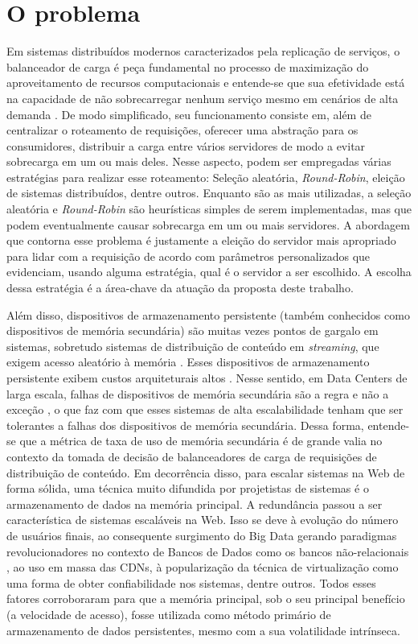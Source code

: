 \section{O problema} \label{sec:problema}

Em sistemas distribuídos modernos caracterizados pela replicação de serviços, o balanceador de carga é peça fundamental no processo de maximização do aproveitamento de recursos computacionais e entende-se que sua efetividade está na capacidade de não sobrecarregar nenhum serviço mesmo em cenários de alta demanda \cite{dos2019balanceamento}. De modo simplificado, seu funcionamento consiste em, além de centralizar o roteamento de requisições, oferecer uma abstração para os consumidores, distribuir a carga entre vários servidores de modo a evitar sobrecarga em um ou mais deles. Nesse aspecto, podem ser empregadas várias estratégias para realizar esse roteamento: Seleção aleatória, \textit{Round-Robin}, eleição de sistemas distribuídos, dentre outros. Enquanto são as mais utilizadas, a seleção aleatória e \textit{Round-Robin} são heurísticas simples de serem implementadas, mas que podem eventualmente causar sobrecarga em um ou mais servidores. A abordagem que contorna esse problema é justamente a eleição do servidor mais apropriado para lidar com a requisição de acordo com parâmetros personalizados que evidenciam, usando alguma estratégia, qual é o servidor a ser escolhido. A escolha dessa estratégia é a área-chave da atuação da proposta deste trabalho.

Além disso, dispositivos de armazenamento persistente (também conhecidos como dispositivos de memória secundária) são muitas vezes pontos de gargalo em sistemas, sobretudo sistemas de distribuição de conteúdo em \textit{streaming}, que exigem acesso aleatório à memória \cite{sivathanu2013IOWorkloads}. Esses dispositivos de armazenamento persistente exibem custos arquiteturais altos \cite{arpaciDusseau98}. Nesse sentido, em Data Centers de larga escala, falhas de dispositivos de memória secundária são a regra e não a exceção \cite{wuEtalIOWorkload}, o que faz com que esses sistemas de alta escalabilidade tenham que ser tolerantes a falhas dos dispositivos de memória secundária. Dessa forma, entende-se que a métrica de taxa de uso de memória secundária é de grande valia no contexto da tomada de decisão de balanceadores de carga de requisições de distribuição de conteúdo. Em decorrência disso, para escalar sistemas na Web de forma sólida, uma técnica muito difundida por projetistas de sistemas é o armazenamento de dados na memória principal. A redundância passou a ser característica de sistemas escaláveis na Web. Isso se deve à evolução do número de usuários finais, ao consequente surgimento do Big Data gerando paradigmas revolucionadores no contexto de Bancos de Dados como os bancos não-relacionais \cite{riseofnewSQL}, ao uso em massa das CDNs, à popularização da técnica de virtualização como uma forma de obter confiabilidade nos sistemas, dentre outros. Todos esses fatores corroboraram para que a memória principal, sob o seu principal benefício (a velocidade de acesso), fosse utilizada como método primário de armazenamento de dados persistentes, mesmo com a sua volatilidade intrínseca.

